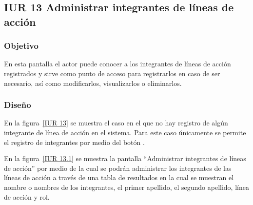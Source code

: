 \subsection{IUR 13 Administrar integrantes de líneas de acción}

\subsubsection{Objetivo}

	
	En esta pantalla el actor  puede conocer a los integrantes de líneas de acción registrados y sirve como punto de acceso para registrarlos en caso de ser necesario, así como modificarlos, visualizarlos o eliminarlos.

\subsubsection{Diseño}


	En la figura~\ref{IUR 13} se muestra el caso en el que no hay registro de algún integrante de línea de acción en el sistema. Para este caso únicamente se permite el registro de integrantes por medio del botón .\\
	

	En la figura~\ref{IUR 13.1} se muestra la pantalla ``Administrar integrantes de líneas de acción'' por medio de la cual se podrán administrar los integrantes de las líneas de acción a través de una tabla de resultados en la cual se muestran el nombre o nombres de los integrantes, el primer apellido, el segundo apellido, línea de acción y rol.\\
	
